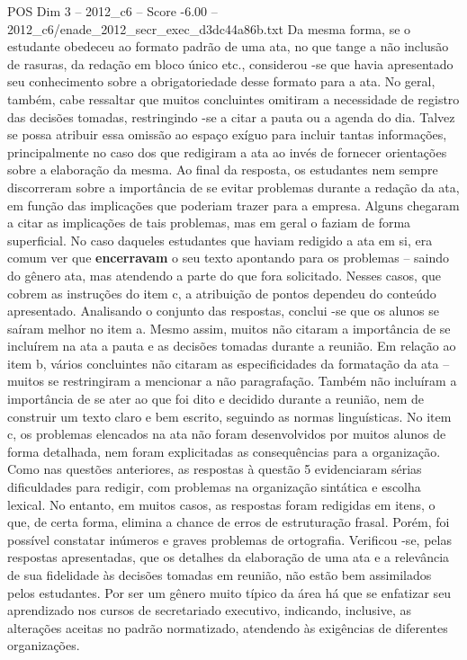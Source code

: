 \begin{textsample}{POS Dim 3 – 2012\_c6 – Score -6.00 – 2012\_c6/enade\_2012\_secr\_exec\_d3dc44a86b.txt}
Da mesma forma, se o estudante obedeceu ao formato padrão de uma ata, no que tange a não inclusão de rasuras, da redação em bloco único etc., considerou -se que havia apresentado seu conhecimento sobre a obrigatoriedade desse formato para a ata.
No geral, também, cabe ressaltar que muitos concluintes omitiram a necessidade de registro das decisões tomadas, restringindo -se a citar a pauta ou a agenda do dia.
Talvez se possa atribuir essa omissão ao espaço exíguo para incluir tantas informações, principalmente no caso dos que redigiram a ata ao invés de fornecer orientações sobre a elaboração da mesma.
Ao final da resposta, os estudantes nem sempre discorreram sobre a importância de se evitar problemas durante a redação da ata, em função das implicações que poderiam trazer para a empresa.
Alguns chegaram a citar as implicações de tais problemas, mas em geral o faziam de forma superficial.
No caso daqueles estudantes que haviam redigido a ata em si, era comum ver que \textbf{encerravam} o seu texto apontando para os problemas – saindo do gênero ata, mas atendendo a parte do que fora solicitado.
Nesses casos, que cobrem as instruções do item c, a atribuição de pontos dependeu do conteúdo apresentado.
Analisando o conjunto das respostas, conclui -se que os alunos se saíram melhor no item a.
Mesmo assim, muitos não citaram a importância de se incluírem na ata a pauta e as decisões tomadas durante a reunião.
Em relação ao item b, vários concluintes não citaram as especificidades da formatação da ata – muitos se restringiram a mencionar a não paragrafação.
Também não incluíram a importância de se ater ao que foi dito e decidido durante a reunião, nem de construir um texto claro e bem escrito, seguindo as normas linguísticas.
No item c, os problemas elencados na ata não foram desenvolvidos por muitos alunos de forma detalhada, nem foram explicitadas as consequências para a organização.
Como nas questões anteriores, as respostas à questão 5 evidenciaram sérias dificuldades para redigir, com problemas na organização sintática e escolha lexical.
No entanto, em muitos casos, as respostas foram redigidas em itens, o que, de certa forma, elimina a chance de erros de estruturação frasal.
Porém, foi possível constatar inúmeros e graves problemas de ortografia.
Verificou -se, pelas respostas apresentadas, que os detalhes da elaboração de uma ata e a relevância de sua fidelidade às decisões tomadas em reunião, não estão bem assimilados pelos estudantes.
Por ser um gênero muito típico da área há que se enfatizar seu aprendizado nos cursos de secretariado executivo, indicando, inclusive, as alterações aceitas no padrão normatizado, atendendo às exigências de diferentes organizações.

\end{textsample}
